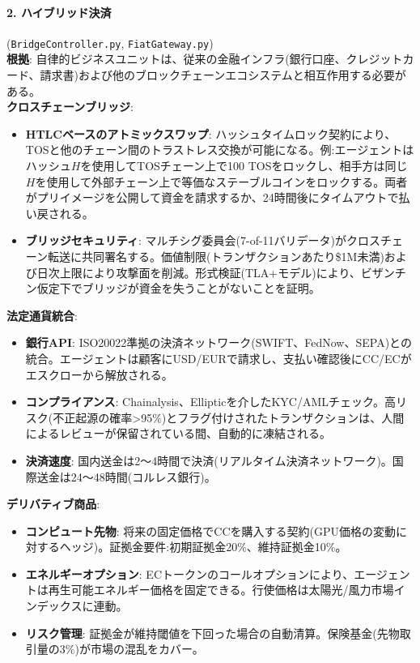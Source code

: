 \documentclass[11pt]{article}
\begin{document}
\paragraph{2. ハイブリッド決済} (\texttt{BridgeController.py}, \texttt{FiatGateway.py})\\
\textbf{根拠}: 自律的ビジネスユニットは、従来の金融インフラ(銀行口座、クレジットカード、請求書)および他のブロックチェーンエコシステムと相互作用する必要がある。\\
\textbf{クロスチェーンブリッジ}:
\begin{itemize}[noitemsep]
  \item \textbf{HTLCベースのアトミックスワップ}: ハッシュタイムロック契約により、TOSと他のチェーン間のトラストレス交換が可能になる。例:エージェントはハッシュ$H$を使用してTOSチェーン上で100 TOSをロックし、相手方は同じ$H$を使用して外部チェーン上で等価なステーブルコインをロックする。両者がプリイメージを公開して資金を請求するか、24時間後にタイムアウトで払い戻される。
  \item \textbf{ブリッジセキュリティ}: マルチシグ委員会(7-of-11バリデータ)がクロスチェーン転送に共同署名する。価値制限(トランザクションあたり\$1M未満)および日次上限により攻撃面を削減。形式検証(TLA+モデル)により、ビザンチン仮定下でブリッジが資金を失うことがないことを証明。
\end{itemize}
\textbf{法定通貨統合}:
\begin{itemize}[noitemsep]
  \item \textbf{銀行API}: ISO20022準拠の決済ネットワーク(SWIFT、FedNow、SEPA)との統合。エージェントは顧客にUSD/EURで請求し、支払い確認後にCC/ECがエスクローから解放される。
  \item \textbf{コンプライアンス}: Chainalysis、Ellipticを介したKYC/AMLチェック。高リスク(不正起源の確率>95\%)とフラグ付けされたトランザクションは、人間によるレビューが保留されている間、自動的に凍結される。
  \item \textbf{決済速度}: 国内送金は2〜4時間で決済(リアルタイム決済ネットワーク)。国際送金は24〜48時間(コルレス銀行)。
\end{itemize}
\textbf{デリバティブ商品}:
\begin{itemize}[noitemsep]
  \item \textbf{コンピュート先物}: 将来の固定価格でCCを購入する契約(GPU価格の変動に対するヘッジ)。証拠金要件:初期証拠金20\%、維持証拠金10\%。
  \item \textbf{エネルギーオプション}: ECトークンのコールオプションにより、エージェントは再生可能エネルギー価格を固定できる。行使価格は太陽光/風力市場インデックスに連動。
  \item \textbf{リスク管理}: 証拠金が維持閾値を下回った場合の自動清算。保険基金(先物取引量の3\%)が市場の混乱をカバー。
\end{itemize}
\end{document}

